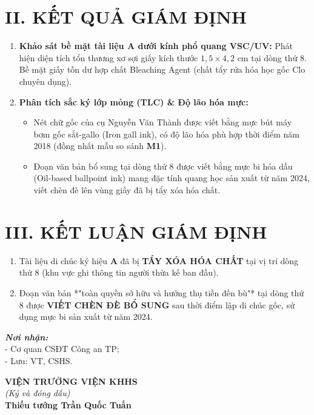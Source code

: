 \documentclass[12pt,a4paper]{article}
\begin{document}
\section*{II. KẾT QUẢ GIÁM ĐỊNH}
\begin{enumerate}[label=\arabic*., leftmargin=1.5cm]
    \item \textbf{Khảo sát bề mặt tài liệu A dưới kính phổ quang VSC/UV:} Phát hiện diện tích tổn thương xơ sợi giấy kích thước $1,5 \times 4,2\text{ cm}$ tại dòng thứ 8. Bề mặt giấy tồn dư hợp chất Bleaching Agent (chất tẩy rửa hóa học gốc Clo chuyên dụng).
    \item \textbf{Phân tích sắc ký lớp mỏng (TLC) \& Độ lão hóa mực:}
    \begin{itemize}[leftmargin=0.5cm]
        \item Nét chữ gốc của cụ Nguyễn Văn Thành được viết bằng mực bút máy bơm gốc sắt-gallo (Iron gall ink), có độ lão hóa phù hợp thời điểm năm 2018 (đồng nhất mẫu so sánh \textbf{M1}).
        \item Đoạn văn bản bổ sung tại dòng thứ 8 được viết bằng mực bi hóa dầu (Oil-based ballpoint ink) mang đặc tính quang học sản xuất từ năm 2024, viết chèn đè lên vùng giấy đã bị tẩy xóa hóa chất.
    \end{itemize}
\end{enumerate}

\section*{III. KẾT LUẬN GIÁM ĐỊNH}
\begin{enumerate}[label=\arabic*., leftmargin=1.5cm]
    \item Tài liệu di chúc ký hiệu \textbf{A} đã bị \textbf{TẨY XÓA HÓA CHẤT} tại vị trí dòng thứ 8 (khu vực ghi thông tin người thừa kế ban đầu).
    \item Đoạn văn bản *"toàn quyền sở hữu và hưởng thụ tiền đền bù"* tại dòng thứ 8 được \textbf{VIẾT CHÈN ĐÈ BỔ SUNG} sau thời điểm lập di chúc gốc, sử dụng mực bi sản xuất từ năm 2024.
\end{enumerate}

\vspace{0.8cm}

\noindent
\begin{minipage}[t]{0.45\textwidth}
    \small
    \textbf{\textit{Nơi nhận:}}\\
    - Cơ quan CSĐT Công an TP;\\
    - Lưu: VT, CSHS.
\end{minipage}
\hfill
\begin{minipage}[t]{0.5\textwidth}
    \begin{center}
        \small
        \textbf{VIỆN TRƯỞNG VIỆN KHHS}\\
        \textit{(Ký và đóng dấu)}\\[1.5cm]
        \textbf{Thiếu tướng Trần Quốc Tuấn}
    \end{center}
\end{minipage}
\end{document}
